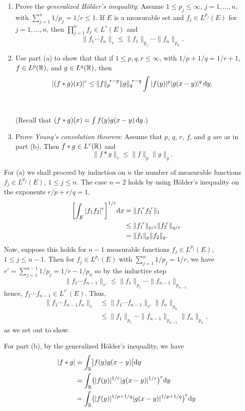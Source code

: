 \begin{problem}
  \hfill
  \begin{enumerate}[label=(\alph*),noitemsep]
  \item Prove the \emph{generalized Hölder's inequality}: Assume
    \(1\leq p_j\leq\infty\), \(j=1,\dotsc,n\), with
    \(\sum_{j=1}^n 1/p_j=1/r\leq 1\). If \(E\) is a measurable set and
    \(f_j\in L^{p_j}(E)\) for \(j=1,\dotsc,n\), then
    \(\prod_{j=1}^n f_j\in L^r(E)\) and
    \[
      \|f_1\dotsm f_n\|_r\leq\|f_1\|_{p_1}\dotsm\|f_n\|_{p_n}.
    \]
  \item Use part (a) to show that that if \(1\leq p,q,r\leq\infty\), with
    \(1/p+1/q=1/r+1\), \(f\in L^p(\mathbb{R})\), and \(g\in L^q(\mathbb{R})\), then
    \[
      |(f*g)(x)|^r\leq{\|f\|_p}^{\!r-p}{\|g\|_q}^{\!r-q}\int|f(y)|^p|g(x-y)|^q\mathop{}\!\mathrm{d}
      y.
    \]
    \\\\
    (Recall that \((f*g)(x)=\int f(y)g(x-y)\mathop{}\!\mathrm{d} y\).)
  \item Prove \emph{Young's convolution theorem}: Assume that \(p\), \(q\),
    \(r\), \(f\), and \(g\) are as in part (b). Then \(f*g\in L^r(\mathbb{R})\)
    and
    \[
      \|f*g\|_r\leq\|f\|_p\|g\|_q.
    \]
  \end{enumerate}
\end{problem}
\begin{solution}
  For (a) we shall proceed by induction on \(n\) the number of measurable
  functions \(f_j\in L^{p_j}(E)\), \(1\leq j\leq n\). The case \(n=2\)
  holds by using Hölder's inequality on the exponents \(r/p+r/q=1\),
  \begin{align*}
    \biggl[\int_E|f_1f_2|^r\biggr]^{1/r}\mathrm{d} x
    &=\|{f_1}^{\!r}{f_2}^{\!r}\|_1\\
    &\leq\|{f_1}^{\!r}\|_{p/r}\|{f_2}^{\!r}\|_{q/r}\\
    &=\|f_1\|_p\|f_2\|_q.
  \end{align*}
  Now, suppose this holds for \(n-1\) measurable functions
  \(f_j\in L^{p_j}(E)\), \(1\leq j\leq n-1\). Then for
  \(f_j\in L^{p_j}(E)\) with \(\sum_{j=1}^n 1/p_j=1/r\), we have
  \(r'=\sum_{j=1}^{n-1}1/p_j=1/r-1/p_n\) so by the inductive step
  \[
    \|f_1\dotsm f_{n-1}\|_{r'}\leq%
    \|f_1\|_{p_1}\dotsm\|f_{n-1}\|_{p_{n-1}}
  \]
  hence, \(f_1\dotsm f_{n-1}\in L^{r'}(E)\). Thus,
  \begin{align*}
    \|f_1\dotsm f_{n-1}f_n\|_r
    &\leq \|f_1\dotsm f_{n-1}\|_{r'}\|f_n\|_{p_n}\\
    &\leq\|f_1\|_{p_1}\dotsm\|f_{n-1}\|_{p_{n-1}}\|f_n\|_{p_n},
  \end{align*}
  as we set out to show.

  For part (b), by the generalized Hölder's inequality, we have
  \begin{align*}
    |f*g|
    &=\int_{\mathbb{R}}\bigl|f(y)g(x-y)\bigr|\mathrm{d} y\\
    &=\int_{\mathbb{R}}\bigl(|f(y)|^{1/r}|g(x-y)|^{1/r}\bigr)^r\mathrm{d} y\\
    &=\int_{\mathbb{R}}\bigl(|f(y)|^{1/p+1/q}|g(x-y)|^{1/p+1/q}\bigr)^r\mathrm{d} y\\
  \end{align*}
\end{solution}

